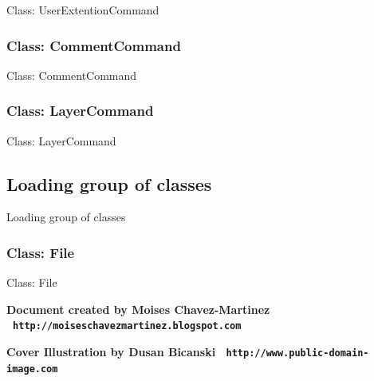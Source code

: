 \documentclass[11pt,twoside,openany,x11names,svgnames]{memoir}
\begin{document}
Class: UserExtentionCommand

\subsubsection{Class: CommentCommand}\label{Class-CommentCommand}

Class: CommentCommand

\subsubsection{Class: LayerCommand}\label{Class-LayerCommand}

Class: LayerCommand

\subsection{Loading group of classes}\label{Loading-group-of-classes}

Loading group of classes

\subsubsection{Class: File}\label{Class-File}

Class: File

\cleartoverso


\enlargethispage{3\baselineskip}
\thispagestyle{empty}
\pagecolor[HTML]{0E0407}

\begin{center}
\begin{minipage}{.8\textwidth}
\color{Cornsilk}\Large\bfseries

\end{minipage}
\end{center}


\begin{center}

\vspace*{\baselineskip}

\textbf{\textcolor{LightGoldenrod!50!Gold}{Document created by Moises Chavez-Martinez \textbullet\ \texttt{http://moiseschavezmartinez.blogspot.com}}}

\vspace*{\baselineskip}

\textbf{\textcolor{LightGoldenrod}{Cover Illustration by Dusan Bicanski \textbullet\ \texttt{http://www.public-domain-image.com}}}
\end{center}
\end{document}
